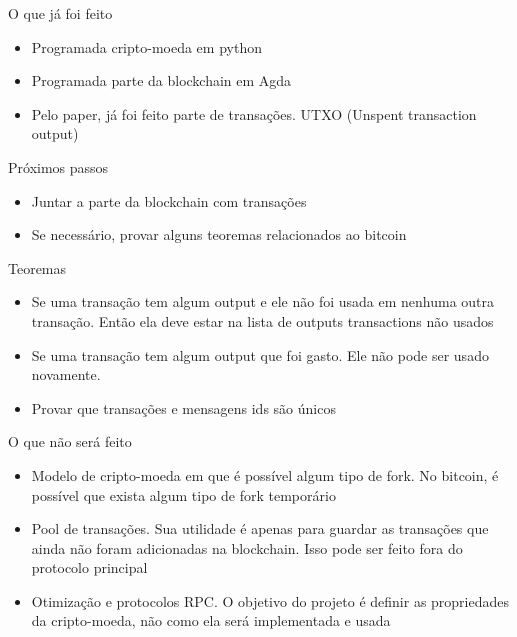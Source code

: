 \documentclass{beamer}
\begin{document}
  \begin{frame}{O que já foi feito}
    \begin{itemize}
        \item Programada cripto-moeda em python
        \item Programada parte da blockchain em Agda
        \item Pelo paper, já foi feito parte de transações. UTXO (Unspent transaction output)
    \end{itemize}
  \end{frame}
  
  \begin{frame}{Próximos passos}
    \begin{itemize}
        \item Juntar a parte da blockchain com transações
        \item Se necessário, provar alguns teoremas relacionados ao bitcoin
    \end{itemize}
  \end{frame}
  
  \begin{frame}{Teoremas}
    \begin{itemize}
        \item Se uma transação tem algum output e ele não foi usada em nenhuma outra transação. Então ela deve estar na lista de outputs transactions não usados
        \item Se uma transação tem algum output que foi gasto. Ele não pode ser usado novamente.
        \item Provar que transações e mensagens ids são únicos
    \end{itemize}
  \end{frame}
  
  \begin{frame}{O que não será feito}
    \begin{itemize}
      \item Modelo de cripto-moeda em que é possível algum tipo de fork. No bitcoin, é possível que exista algum tipo de fork temporário
      \item Pool de transações. Sua utilidade é apenas para guardar as transações que ainda não foram adicionadas na blockchain. 
      Isso pode ser feito fora do protocolo principal
      \item Otimização e protocolos RPC. O objetivo do projeto é definir as propriedades da cripto-moeda, não como ela será implementada e usada
    \end{itemize}
  \end{frame}
  
\end{document}
